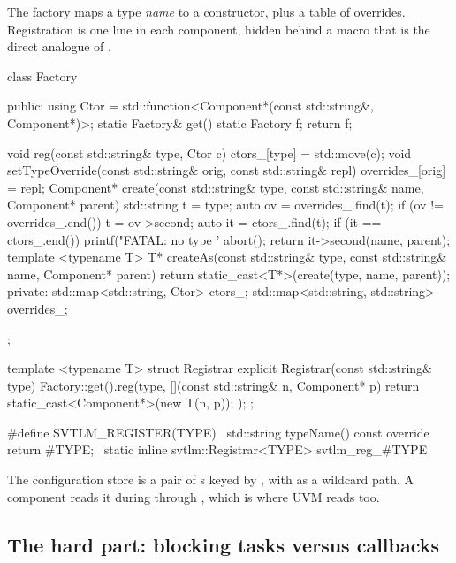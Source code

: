 The factory maps a type \emph{name} to a constructor, plus a table of
overrides. Registration is one line in each component, hidden behind a macro
that is the direct analogue of .

\begin{cppcode}[caption={Factory and registration},label={lst:verilator:factory}]
class Factory {
  public:
    using Ctor = std::function<Component*(const std::string&, Component*)>;
    static Factory& get() { static Factory f; return f; }

    void reg(const std::string& type, Ctor c) { ctors_[type] = std::move(c); }
    void setTypeOverride(const std::string& orig, const std::string& repl) {
        overrides_[orig] = repl;
    }
    Component* create(const std::string& type, const std::string& name,
                      Component* parent) {
        std::string t = type;
        auto ov = overrides_.find(t);
        if (ov != overrides_.end()) t = ov->second;
        auto it = ctors_.find(t);
        if (it == ctors_.end()) { printf("FATAL: no type '%
                                  abort(); }
        return it->second(name, parent);
    }
    template <typename T>
    T* createAs(const std::string& type, const std::string& name,
                Component* parent) {
        return static_cast<T*>(create(type, name, parent));
    }
  private:
    std::map<std::string, Ctor>        ctors_;
    std::map<std::string, std::string> overrides_;
};

template <typename T>
struct Registrar {
    explicit Registrar(const std::string& type) {
        Factory::get().reg(type, [](const std::string& n, Component* p) {
            return static_cast<Component*>(new T(n, p));
        });
    }
};

#define SVTLM_REGISTER(TYPE)                                     \
    std::string typeName() const override { return #TYPE; }      \
    static inline svtlm::Registrar<TYPE> svtlm_reg_{#TYPE}
\end{cppcode}

The configuration store is a pair of s keyed by
, with  as a wildcard path. A
component reads it during \code{build()} through , which is
where UVM reads \code{uvm\_config\_db} too.

\subsection{The hard part: blocking tasks versus callbacks}

